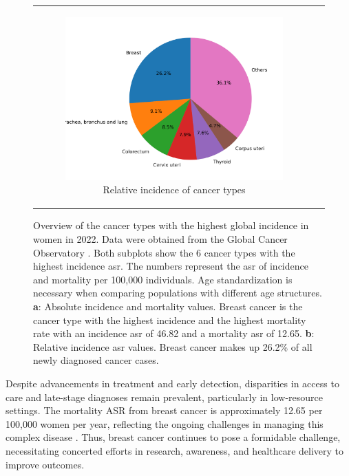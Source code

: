 \begin{figure}[ht]
\begin{tabular}{cc}
\begin{subfigure}{0.5\textwidth}
            \includegraphics[width=\linewidth]{chapters/2_background/figures/pie.png}
            \caption{Relative incidence of cancer types}
            \label{fig:brca_pie}
        \end{subfigure} \end{tabular} \caption{Overview of the cancer types
        with the highest global incidence in women in 2022.
        Data were obtained from the Global Cancer Observatory
        \supercite{bray_global_2024,ferlay_global_2024}.
        Both subplots show the 6 cancer types with the highest incidence \gls{asr}.
        The numbers represent the \gls{asr} of incidence and mortality per 100,000
        individuals.
        Age standardization is necessary when comparing populations with different age
        structures\supercite{segi_age-adjusted_1960,doll_cancer_1966}.
        \textbf{a}: Absolute incidence and mortality values.
        Breast cancer is the cancer type with the highest incidence and the highest
        mortality rate with an incidence \gls{asr} of 46.82 and a mortality \gls{asr}
        of 12.65.
        \textbf{b}: Relative incidence \gls{asr} values.
        Breast cancer makes up 26.2\% of all newly diagnosed cancer cases.
    }
    \label{fig:brca_incidence_mortality} \end{figure}

Despite advancements in treatment and early detection, disparities in access to
care and late-stage diagnoses remain prevalent, particularly in low-resource
settings\supercite{wilkinson_understanding_2022,ginsburg_breast_2020}.
The mortality ASR from breast cancer is approximately 12.65 per 100,000 women
per year, reflecting the ongoing challenges in managing this complex disease
\supercite{bray_global_2024,ferlay_global_2024}.
Thus, breast cancer continues to pose a formidable challenge, necessitating
concerted efforts in research, awareness, and healthcare delivery to improve
outcomes\supercite{desantis_breast_2019}.

